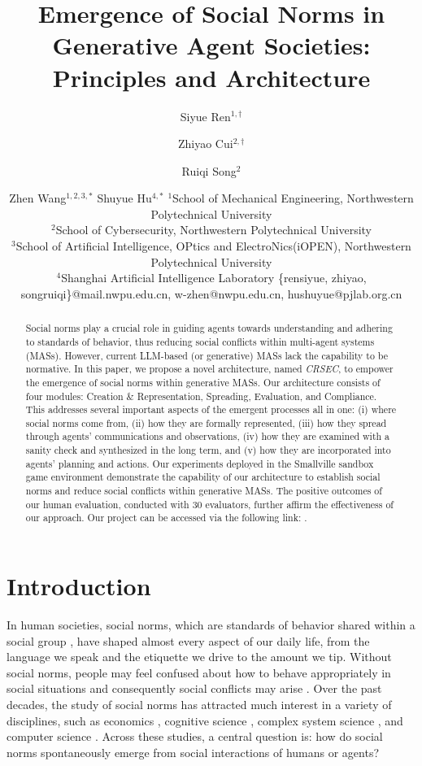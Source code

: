 \documentclass{article}
\title{Emergence of Social Norms in Generative Agent Societies:\\
Principles and Architecture}
\author{
Siyue Ren$^{1,\dag}$
\and
Zhiyao Cui$^{2,\dag}$\and
Ruiqi Song$^2$\and
Zhen Wang$^{1,2,3,*}$\And
Shuyue Hu$^{4,*}$
\affiliations
$^1$School of Mechanical Engineering, Northwestern Polytechnical University\\
$^2$School of Cybersecurity, Northwestern Polytechnical University\\
$^3$School of Artificial Intelligence, OPtics and ElectroNics(iOPEN), Northwestern Polytechnical University\\
$^4$Shanghai Artificial Intelligence Laboratory
\emails
\{rensiyue, zhiyao, songruiqi\}@mail.nwpu.edu.cn,
w-zhen@nwpu.edu.cn,
hushuyue@pjlab.org.cn
}
\begin{document}
\maketitle

\begin{abstract} 
\renewcommand{\thefootnote}{\fnsymbol{footnote}}
    Social norms play a crucial role in guiding agents towards understanding and adhering to standards of behavior, thus reducing social conflicts within multi-agent systems (MASs). However, current LLM-based (or generative) MASs lack the capability to be normative. In this paper, we propose a novel architecture, named \textit{CRSEC},
    to empower the emergence of social norms within generative MASs.
    Our architecture 
    consists of four modules: Creation \& Representation, Spreading, Evaluation, and Compliance. 
    This addresses  
    several important aspects of the emergent processes all in one: 
    (i) where social norms come from, (ii) how they are formally represented, (iii) how they spread through agents' communications and observations, (iv) how they are examined with a sanity check and synthesized in the long term, and (v) how they are incorporated into agents' planning and actions.  
    Our experiments deployed in the Smallville sandbox game environment demonstrate the capability of our architecture to establish social norms and reduce social conflicts within 
 generative MASs.
The positive outcomes of our human evaluation, conducted with 30 evaluators, further affirm the effectiveness of our approach. Our project can be accessed via the following link: \href{https://github.com/sxswz213/CRSEC}{\color{blue}{https://github.com/sxswz213/CRSEC}}.
\end{abstract}


\section{Introduction}
In human societies, social norms, which are standards of behavior shared within a social group \cite{sherif1936psychology},  have shaped almost every aspect of our daily life, from the language we speak and the etiquette we drive to the amount we tip. Without social norms, people may feel confused about how to behave appropriately in social situations and consequently social conflicts may arise \cite{lewis1969convention}.
Over the past decades, the study of social norms has attracted much interest in a variety of disciplines, such as economics \cite{young2015evolution},  cognitive science \cite{hawkins2019emergence},  complex system science \cite{centola2018experimental}, and computer science \cite{morris2019norm}.
Across these studies, a central question is: how do social norms spontaneously emerge
from social interactions of humans or agents?
\end{document}
